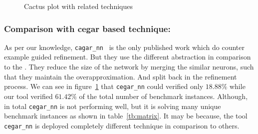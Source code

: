 




\begin{figure}
    \centering
    
    \caption{Cactus plot with related techniques}
    \label{res:milp_with_milp}
\end{figure}

\subsubsection{Comparison with cegar based technique: }
As per our knowledge, \texttt{cagar\_nn}~\cite{elboher2020abstraction} is the only published work which do 
counter example guided refinement. But they use the different abstraction in comparison to the 
\deeppoly{}. They reduce the size of the network by merging the similar neurons, such that 
they maintain the overapproximation. And split back in the refinement process. 
We can see in figure~\ref{res:milp_with_milp} that \texttt{cegar\_nn} could verified only 
$18.88\%$ while our tool verified $61.42\%$ of the total number of benchmark instances. 
Although, in total \texttt{cegar\_nn} is not performing well, but it is solving many unique benchmark instances 
as shown in table~\ref{tb:matrix}. 
It may be because, the tool \texttt{cegar\_nn} is deployed completely different technique in comparison to others. 


